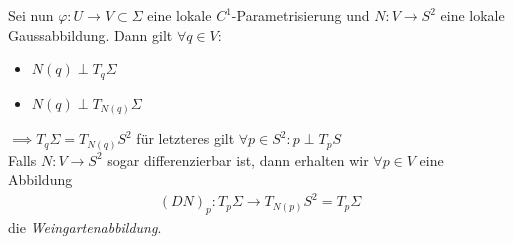 \documentclass[../main.tex]{subfiles}
\begin{document}
Sei nun $\varphi : U \to V \subset \Sigma$ eine lokale $C^{1}$-Parametrisierung und $N:V \to S^{2}$ eine lokale Gaussabbildung. Dann gilt $\forall q \in V$:
\begin{itemize}
    \item $N(q)\perp T_{q}\Sigma$
    \item $N(q)\perp T_{N(q)}\Sigma$
\end{itemize}
$\implies T_{q}\Sigma = T_{N(q)}S^{2}$
für letzteres gilt $\forall p \in S^{2}: p\perp T_{p}S$\\ 
Falls $N:V \to S^{2}$ sogar differenzierbar ist, dann erhalten wir $\forall p \in V$ eine Abbildung
\begin{align*}
    (DN)_{p}: T_{p}\Sigma \to T_{N(p)}S^{2} = T_{p}\Sigma    
\end{align*}
die \emph{Weingartenabbildung}.
\end{document}
